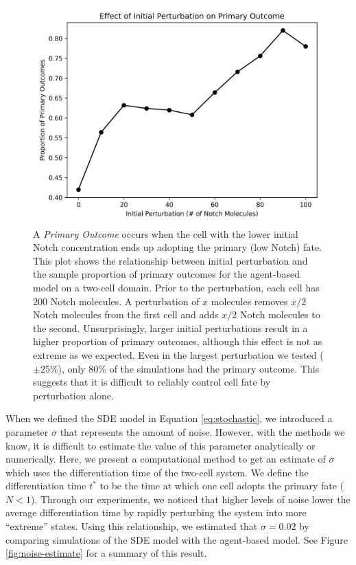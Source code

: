 \documentclass{article}
\begin{document}
\begin{figure}[!htp]
  \includegraphics[width=\textwidth]{img/vis12.png}
  \caption{A \emph{Primary Outcome} occurs when the cell with the lower initial Notch concentration ends up adopting the primary (low Notch) fate. This plot shows the relationship between initial perturbation and the sample proportion of primary outcomes for the agent-based model on a two-cell domain. Prior to the perturbation, each cell has $200$ Notch molecules. A perturbation of $x$ molecules removes $x/2$ Notch molecules from the first cell and adds $x/2$ Notch molecules to the second. Unsurprisingly, larger initial perturbations result in a higher proportion of primary outcomes, although this effect is not as extreme as we expected. Even in the largest perturbation we tested ($\pm 25\%$), only $80\%$ of the simulations had the primary outcome. This suggests that it is difficult to reliably control cell fate by perturbation alone.}
  \label{fig:outcome-forcing}
\end{figure}

When we defined the SDE model in Equation \ref{eq:stochastic}, we introduced a parameter $\sigma$ that represents the amount of noise.
However, with the methods we know, it is difficult to estimate the value of this parameter analytically or numerically.
Here, we present a computational method to get an estimate of $\sigma$ which uses the differentiation time of the two-cell system.
We define the differentiation time $t^{*}$ to be the time at which one cell adopts the primary fate ($N < 1$).
Through our experiments, we noticed that higher levels of noise lower the average differentiation time by rapidly perturbing the system into more ``extreme'' states.
Using this relationship, we estimated that $\sigma = 0.02$ by comparing simulations of the SDE model with the agent-based model.
See Figure \ref{fig:noise-estimate} for a summary of this result.
\end{document}
